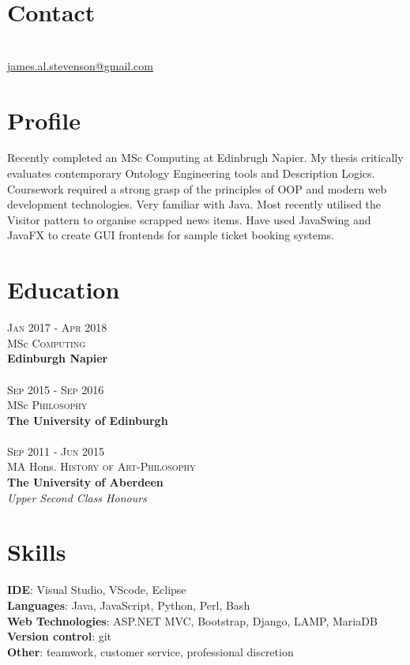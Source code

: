 \documentclass[12pt, a4paper]{article}
\begin{document}
\par{\bigskip\par}
\section{Contact}
\large{}\\
\href{mailto:james.al.stevenson@gmail.com}{james.al.stevenson@gmail.com}\\

\begin{multicols}{2}

\section{Profile}
Recently completed an MSc Computing at Edinbrugh Napier.
My thesis critically evaluates contemporary Ontology Engineering tools and Description Logics.
Coursework required a strong grasp of the principles of OOP and modern web development technologies.
Very familiar with Java.
Most recently utilised the Visitor pattern to organise scrapped news items.
Have used JavaSwing and JavaFX to create GUI frontends for sample ticket booking systems.

\section{Education}
\textsc{Jan} 2017 - \textsc{Apr} 2018\\
MSc \textsc{Computing} \\
\textbf{Edinburgh Napier}\\~\\
\textsc{Sep} 2015 - \textsc{Sep} 2016\\
MSc \textsc{Philosophy} \\ 
\textbf{The University of Edinburgh}\\~\\
\textsc{Sep} 2011 - \textsc{Jun} 2015\\
MA Hons. \textsc{History of Art}-\textsc{Philosophy}\\ 
\textbf{The University of Aberdeen}\\ 
\small\emph{Upper Second Class Honours}\\

\section{Skills}
\large{\textbf{IDE}: Visual Studio, VScode, Eclipse\\
\textbf{Languages}: Java, JavaScript, Python, Perl, Bash\\
\textbf{Web Technologies}: ASP.NET MVC, Bootstrap, Django, LAMP, MariaDB\\
\textbf{Version control}: git\\
\textbf{Other}: teamwork, customer service, professional discretion\\}



\end{multicols}
\end{document}
